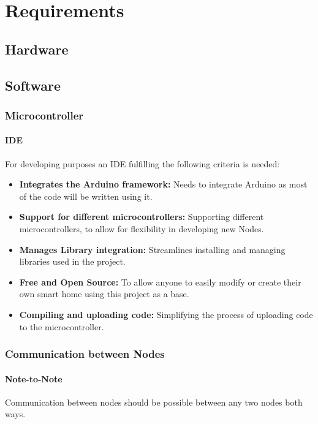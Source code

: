 \chapter{Requirements} 
    \section{Hardware}
    \section{Software}
        \subsection{Microcontroller}
            \subsubsection{IDE}
            For developing purposes an IDE fulfilling the following criteria is needed:
            \begin{itemize}
                \item \textbf{Integrates the Arduino framework:}
                Needs to integrate Arduino as most of the code will be written using it.
                \item \textbf{Support for different microcontrollers:}
                Supporting different microcontrollers, to allow for flexibility
                in developing new Nodes.
                \item \textbf{Manages Library integration:}
                Streamlines installing and managing libraries used in the project.
                \item \textbf{Free and Open Source:}
                To allow anyone to easily modify  or create their own smart home
                using this project as a base.
                \item \textbf{Compiling and uploading code:} 
                Simplifying the process of uploading code to the microcontroller.
            \end{itemize} 

        \subsection{Communication between Nodes}
        
            \subsubsection{Note-to-Note}
            Communication between nodes should be possible between any two nodes
            both ways.

